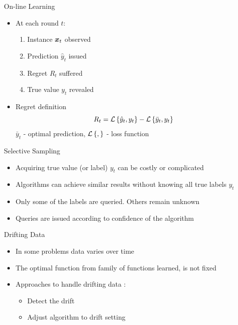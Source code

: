 \documentclass{beamer}
\begin{document}
\begin{frame}{On-line Learning}
\begin{itemize}
\item At each round $t$:\newline
\begin{enumerate}
\item Instance ${\boldsymbol{x}}_{t}$ observed\newline
\item Prediction $\hat{y}_t$ issued\newline
\item Regret $R_t$ suffered\newline
\item True value $y_t$ revealed\newline
\end{enumerate}
\item Regret definition
\begin{equation*}
R_t={\mathcal{L}}\left\{\hat{y}_t,y_t\right\}-{\mathcal{L}}\left\{\bar{y}_t,y_t\right\}
\end{equation*}
$\bar{y}_t$ - optimal prediction, ${\mathcal{L}}\left\{,\right\}$ - loss function
\end{itemize}
\end{frame}


\begin{frame}{Selective Sampling}
\begin{itemize}
\item Acquiring true value (or label) $y_t$ can be costly or complicated\newline
\item Algorithms can achieve similar results without knowing all true labels $y_t$\newline
\item Only some of the labels are queried. Others remain unknown\newline
\item Queries are issued according to confidence of the algorithm
\end{itemize}

\end{frame}

\begin{frame}{Drifting Data}
\begin{itemize}
\item In some problems data varies over time\newline
\item The optimal function from family of functions learned, is not fixed\newline
\item Approaches to handle drifting data :\newline
\begin{itemize}
\item Detect the drift\newline
\item Adjust algorithm to drift setting
\end{itemize}
\end{itemize}
\end{frame}
\end{document}
